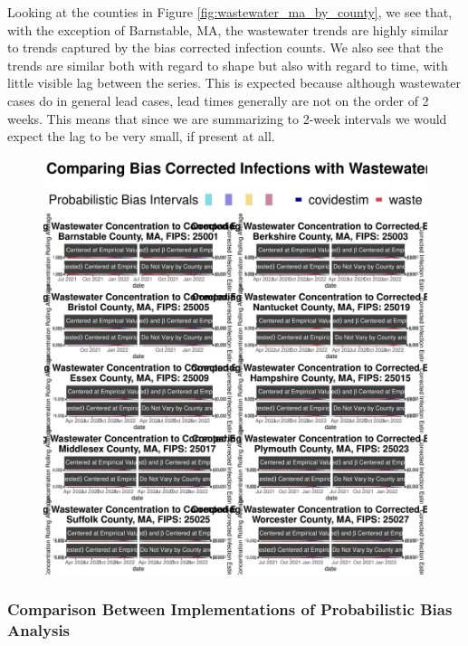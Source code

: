 \documentclass[12pt,twoside]{smiththesis}
\begin{document}
Looking at the counties in Figure \ref{fig:wastewater_ma_by_county}, we see that, with the exception of Barnstable, MA, the wastewater trends are highly similar to trends captured by the bias corrected infection counts. We also see that the trends are similar both with regard to shape but also with regard to time, with little visible lag between the series. This is expected because although wastewater cases do in general lead cases, lead times generally are not on the order of 2 weeks. This means that since we are summarizing to 2-week intervals we would expect the lag to be very small, if present at all.
\begin{figure}
\includegraphics[width=1\linewidth]{figure/wastewater_ma_by_county} \caption{\label{fig:wastewater_ma_by_county}}\label{fig:unnamed-chunk-84}
\end{figure}
\hypertarget{comparison-between-implementations-of-probabilistic-bias-analysis}{%
\subsubsection{Comparison Between Implementations of Probabilistic Bias Analysis}\label{comparison-between-implementations-of-probabilistic-bias-analysis}}
\end{document}
